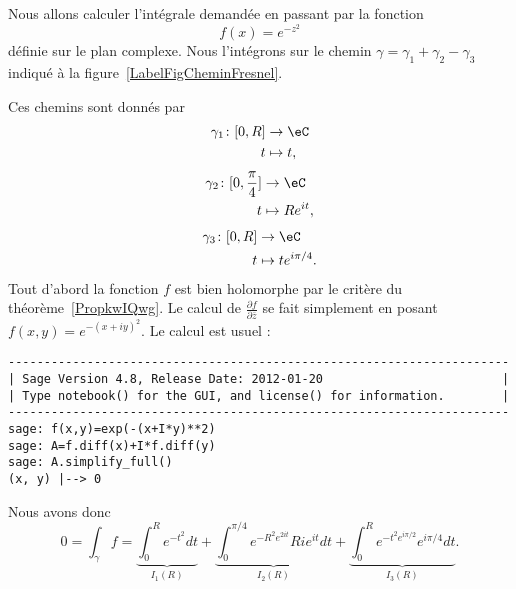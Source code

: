 Nous allons calculer l'intégrale demandée en passant par la fonction
\begin{equation}
    f(x)= e^{-z^2}
\end{equation}
définie sur le plan complexe. Nous l'intégrons sur le chemin \( \gamma=\gamma_1+\gamma_2-\gamma_3\) indiqué à la figure~\ref{LabelFigCheminFresnel}.
\newcommand{\CaptionFigCheminFresnel}{Chemin d'intégration pour l'intégrale de Fresnel}

Ces chemins sont donnés par
\begin{equation}
    \begin{aligned}
        \gamma_1\colon \mathopen[ 0 , R \mathclose]&\to \eC \\
        t&\mapsto t,
    \end{aligned}
\end{equation}
\begin{equation}
    \begin{aligned}
        \gamma_2\colon \mathopen[ 0 , \frac{ \pi }{ 4 } \mathclose]&\to \eC \\
        t&\mapsto R e^{it},
    \end{aligned}
\end{equation}
\begin{equation}
    \begin{aligned}
        \gamma_3\colon \mathopen[ 0 , R \mathclose]&\to \eC \\
        t&\mapsto t e^{i\pi/4}.
    \end{aligned}
\end{equation}
Tout d'abord la fonction \( f\) est bien holomorphe par le critère du théorème~\ref{PropkwIQwg}. Le calcul de \( \frac{ \partial f }{ \partial \bar z }\) se fait simplement en posant \( f(x,y)= e^{-(x+iy)^2}\). Le calcul est usuel :
\begin{verbatim}
----------------------------------------------------------------------
| Sage Version 4.8, Release Date: 2012-01-20                         |
| Type notebook() for the GUI, and license() for information.        |
----------------------------------------------------------------------
sage: f(x,y)=exp(-(x+I*y)**2)
sage: A=f.diff(x)+I*f.diff(y)
sage: A.simplify_full()
(x, y) |--> 0
\end{verbatim}
Nous avons donc
\begin{equation}    \label{EqfaoRgU}
    0=\int_{\gamma}f=\underbrace{\int_0^R e^{-t^2}dt}_{I_1(R)}+\underbrace{\int_0^{\pi/4} e^{-R^2 e^{2it}}Ri e^{it}dt}_{I_2(R)}+\underbrace{\int_0^R e^{-t^2 e^{i\pi/2}} e^{i\pi/4}dt}_{I_3(R)}.
\end{equation}
